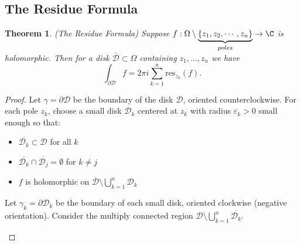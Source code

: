 \documentclass[a4paper]{article}
\newtheorem{thm}{Theorem}[section]
\begin{document}
\subsection{The Residue Formula}
\begin{thm}
    (The Residue Formula) Suppose $f:\Omega \setminus \underbrace{\{z_1,z_2,\cdots,z_n\}}_{poles}\to \C$ is holomorphic. Then for a disk $\overline{\mathcal{D}}\subset \Omega$ containing $z_1,...,z_n$ we have \[
    \int_{\partial \mathcal{D}}f=2\pi i \sum_{k=1}^n \text{res}_{z_k}(f)
    .\] 
\end{thm}
\begin{proof}
    Let $\gamma=\partial \mathcal{D}$ be the boundary of the disk $\mathcal{D}$, oriented counterclockwise. For each pole $z_k$, choose a small disk $\mathcal{D}_k$ centered at $z_k$ with radius $\varepsilon_k>0$ small enough so that:
    \begin{itemize}
        \item $\overline{\mathcal{D}_k}\subset \mathcal{D}$ for all $k$
        \item $\overline{\mathcal{D}_k}\cap \overline{\mathcal{D}_j}=\emptyset$ for $k\neq j$
        \item $f$ is holomorphic on $\overline{\mathcal{D}}\setminus \bigcup_{k=1}^n \mathcal{D}_k$
    \end{itemize}
    Let $\gamma_k=\partial \mathcal{D}_k$ be the boundary of each small disk, oriented clockwise (negative orientation). Consider the multiply connected region $\mathcal{D}\setminus \bigcup_{k=1}^n \overline{\mathcal{D}_k}$.
    
    \begin{center}
\end{center}
\end{proof}
\end{document}
